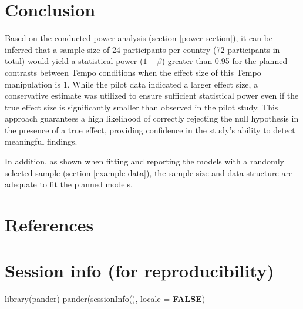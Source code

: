 \documentclass[
  bookmarksnumbered]{article}
\newenvironment{Shaded}{\begin{snugshade}}{\end{snugshade}}
\newcommand{\AttributeTok}[1]{\textcolor[rgb]{0.80,0.80,0.80}{#1}}
\newcommand{\ConstantTok}[1]{\textcolor[rgb]{0.86,0.64,0.64}{\textbf{#1}}}
\newcommand{\FunctionTok}[1]{\textcolor[rgb]{0.94,0.94,0.56}{#1}}
\newcommand{\NormalTok}[1]{\textcolor[rgb]{0.80,0.80,0.80}{#1}}
\begin{document}
\hypertarget{conclusion}{%
\section{Conclusion}\label{conclusion}}

Based on the conducted power analysis (section \ref{power-section}), it can be inferred that a sample size of 24 participants per country (72 participants in total) would yield a statistical power (\(1 - \beta\)) greater than 0.95 for the planned contrasts between Tempo conditions when the effect size of this Tempo manipulation is 1. While the pilot data indicated a larger effect size, a conservative estimate was utilized to ensure sufficient statistical power even if the true effect size is significantly smaller than observed in the pilot study. This approach guarantees a high likelihood of correctly rejecting the null hypothesis in the presence of a true effect, providing confidence in the study's ability to detect meaningful findings.

In addition, as shown when fitting and reporting the models with a randomly selected sample (section \ref{example-data}), the sample size and data structure are adequate to fit the planned models.

\hypertarget{refs}{%
\section*{References}\label{refs}}

\begin{multicols}{2}
\AtNextBibliography{\footnotesize}
\printbibliography[heading=none]
\normalsize
\end{multicols}

\def\printbibliography{}

\hypertarget{session}{%
\section*{Session info (for reproducibility)}\label{session}}

\begin{Shaded}
\begin{Highlighting}[]
\FunctionTok{library}\NormalTok{(pander)}
\FunctionTok{pander}\NormalTok{(}\FunctionTok{sessionInfo}\NormalTok{(), }\AttributeTok{locale =} \ConstantTok{FALSE}\NormalTok{)}
\end{Highlighting}
\end{Shaded}
\end{document}
